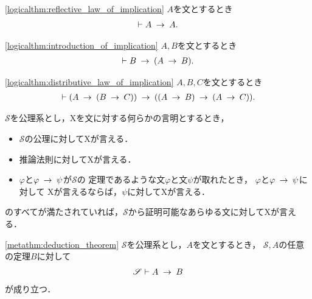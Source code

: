 	\begin{screen}
		\begin{logicalthm}[含意の反射律]
		\ref{logicalthm:reflective_law_of_implication}
			$A$を文とするとき
			\begin{align}
				\vdash A \hspace{0.25em}\rightarrow\hspace{0.25em} A.
			\end{align}
		\end{logicalthm}
	\end{screen}
	
	\begin{screen}
		\begin{logicalthm}[含意の導入]
		\ref{logicalthm:introduction_of_implication}
			$A,B$を文とするとき
			\begin{align}
				\vdash B \hspace{0.25em}\rightarrow\hspace{0.25em} (A \hspace{0.25em}\rightarrow\hspace{0.25em} B).
			\end{align}
		\end{logicalthm}
	\end{screen}
	
	\begin{screen}
		\begin{logicalthm}[含意の分配則]
		\ref{logicalthm:distributive_law_of_implication}
			$A,B,C$を文とするとき
			\begin{align}
				\vdash (A \hspace{0.25em}\rightarrow\hspace{0.25em} (B \hspace{0.25em}\rightarrow\hspace{0.25em} C)) \hspace{0.25em}\rightarrow\hspace{0.25em} ((A \hspace{0.25em}\rightarrow\hspace{0.25em} B) \hspace{0.25em}\rightarrow\hspace{0.25em} (A \hspace{0.25em}\rightarrow\hspace{0.25em} C)).
			\end{align}
		\end{logicalthm}
	\end{screen}
	
	\begin{screen}
		\begin{metaaxm}[証明に対する構造的帰納法]
			$\mathscr{S}$を公理系とし，Xを文に対する何らかの言明とするとき，
			\begin{itemize}
				\item $\mathscr{S}$の公理に対してXが言える．
				\item 推論法則に対してXが言える．
				\item $\varphi$と$\varphi \hspace{0.25em}\rightarrow\hspace{0.25em} \psi$が$\mathscr{S}$の
					定理であるような文$\varphi$と文$\psi$が取れたとき，
					$\varphi$と$\varphi \hspace{0.25em}\rightarrow\hspace{0.25em} \psi$に対して
					Xが言えるならば，$\psi$に対してXが言える．
			\end{itemize}
			のすべてが満たされていれば，$\mathscr{S}$から証明可能なあらゆる文に対してXが言える．
		\end{metaaxm}
	\end{screen}
	
	\begin{screen}
		\begin{metathm}[演繹法則]\ref{metathm:deduction_theorem}
			$\mathscr{S}$を公理系とし，$A$を文とするとき，
			$\mathscr{S}, A$の任意の定理$B$に対して
			\begin{align}
				\mathscr{S} \vdash A \hspace{0.25em}\rightarrow\hspace{0.25em} B
			\end{align}
			が成り立つ．
		\end{metathm}
	\end{screen}
	

